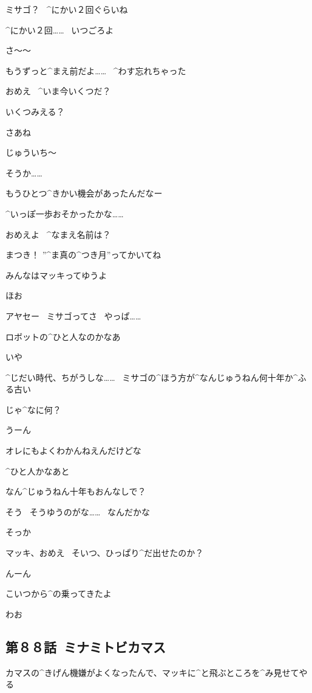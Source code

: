\Makki ミサゴ？
\ ^{にかい}{２回}ぐらいね

\Ayase ^{にかい}{２回}……
\ いつごろよ

\Makki さ〜〜

\Makki もうずっと^{まえ}{前}だよ……
\ ^{わす}{忘}れちゃった

\page[148]
\Ayase おめえ
\ ^{いま}{今}いくつだ？

\Makki いくつみえる？

\Ayase さあね

\Makki じゅういち〜

\Ayase そうか……

\Ayase もうひとつ^{きかい}{機会}があったんだなー

\Ayase ^{いっぽ}{一歩}おそかったかな……

\page[149]
\Ayase おめえよ
\ ^{なまえ}{名前}は？

\Makki まつき！
”^{ま}{真}の^{つき}{月}”ってかいてね

\Makki みんなはマッキってゆうよ

\Ayase ほお

\Makki アヤセー
\ ミサゴってさ
\ やっぱ……

\Makki ロボットの^{ひと}{人}なのかなあ

\Ayase いや

\Ayase ^{じだい}{時代}、ちがうしな……
\ ミサゴの^{ほう}{方}が^{なんじゅうねん}{何十年}か^{ふる}{古}い

\page[150]
\Makki じゃ^{なに}{何}？

\Ayase うーん

\Ayase オレにもよくわかんねえんだけどな

\Ayase ^{ひと}{人}かなあと

\Makki なん^{じゅうねん}{十年}もおんなしで？

\Ayase そう
\ そうゆうのがな……
\ なんだかな

\Makki そっか

\page[151]
\Ayase マッキ、おめえ
\ そいつ、ひっぱり^{だ}{出}せたのか？

\Makki んーん

\Makki こいつから^{の}{乗}ってきたよ

\page[152]
\Makki わお


\subsection{第８８話\ ミナミトビカマス}

\page[154]
\Ayase カマスの^{きげん}{機嫌}がよくなったんで、マッキに^{と}{飛}ぶところを^{み}{見}せてやる


